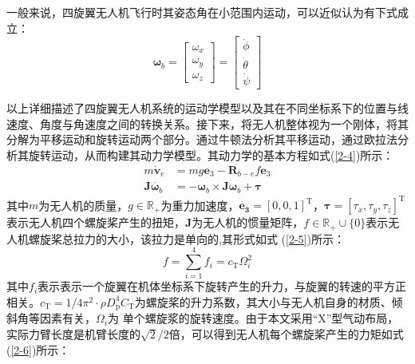 \documentclass[lang=chs, degree=master, blindreview=false, winfonts=true]{yanputhesis}
\begin{document}
一般来说，四旋翼无人机飞行时其姿态角在小范围内运动，可以近似认为有下式成立：
\begin{equation}
	\boldsymbol{\omega}_b=\begin{bmatrix}{\omega}_x\\{\omega}_y\\{\omega}_z\end{bmatrix}=\begin{bmatrix}\dot{\phi}\\\dot{\theta}\\\dot{\psi}\end{bmatrix}
	\label{2-3}
\end{equation}

以上详细描述了四旋翼无人机系统的运动学模型以及其在不同坐标系下的位置与线速度、角度与角速度之间的转换关系。接下来，将无人机整体视为一个刚体，将其分解为平移运动和旋转运动两个部分。通过牛顿法分析其平移运动，通过欧拉法分析其旋转运动，从而构建其动力学模型。其动力学的基本方程如式(\ref{2-4})所示：
\begin{equation}
	\begin{aligned}
		m\dot{\boldsymbol{v}}_e&=mg\bm{e}_{3}-\boldsymbol{R}_{b-e}f\bm{e}_{3}\\
		\boldsymbol{J}\dot{\boldsymbol{\omega}_b}&=-\bm \omega_b \times \bm J \bm \omega_b+\boldsymbol{\tau}
	\end{aligned}\label{2-4}
\end{equation}
其中$m$为无人机的质量，$g\in\mathbb{R}_+$为重力加速度，$\bm{e_{3}}=\left[0,0,1\right]^\mathrm{T}$，$\boldsymbol{\tau}=\left[\tau_x,\tau_y,\tau_z\right]^\mathrm{T}$表示无人机四个螺旋桨产生的扭矩，$\boldsymbol{J}$为无人机的惯量矩阵，$f\in\mathbb{R}_+\cup\{0\}$表示无人机螺旋桨总拉力的大小，该拉力是单向的,其形式如式 (\ref{2-5})所示：
\begin{equation}
	f=\sum_{i=1}^4f_i=c_\mathrm{T}\Omega_i^2
	\label{2-5}
\end{equation}
其中$f_i$表示表示一个旋翼在机体坐标系下旋转产生的升力，与旋翼的转速的平方正相关。$c_\mathrm{T}=1/4\pi^2\cdot\rho D_\mathrm{p}^4C_\mathrm{T}$为螺旋桨的升力系数，其大小与无人机自身的材质、倾斜角等因素有关，$\Omega_i$为
单个螺旋浆的旋转速度。由于本文采用“X”型气动布局，实际力臂长度是机臂长度的$\sqrt{2}/2$倍，可以得到无人机每个螺旋桨产生的力矩如式(\ref{2-6})所示：
\end{document}
